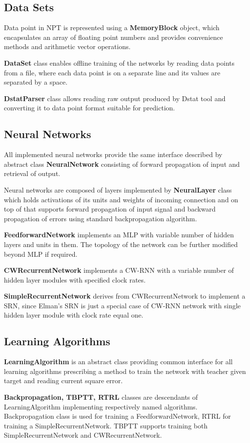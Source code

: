 \documentclass[12pt,oneside]{fithesis2}
\begin{document}
\subsection{Data Sets}
	Data point in NPT is represented using a \textbf{MemoryBlock} object, which encapsulates an array of floating point numbers and provides convenience methods and arithmetic vector operations.\par
	\textbf{DataSet} class enables offline training of the networks by reading data points from a file, where each data point is on a separate line and its values are separated by a space. \par
	\textbf{DstatParser} class allows reading raw output produced by Dstat tool and converting it to data point format suitable for prediction.
\subsection{Neural Networks}
All implemented neural networks provide the same interface described by abstract class \textbf{NeuralNetwork} consisting of forward propagation of input and retrieval of output. \par
Neural networks are composed of layers implemented by \textbf{NeuralLayer} class which holds activations of its units and weights of incoming connection and on top of that supports forward propagation of input signal and backward propagation of errors using standard backpropagation algorithm. \par
\textbf{FeedforwardNetwork} implements an MLP with variable number of hidden layers and units in them. The topology of the network can be further modified beyond MLP if required. \par
\textbf{CWRecurrentNetwork} implements a CW-RNN with a variable number of hidden layer modules with specified clock rates. \par
\textbf{SimpleRecurrentNetwork} derives from CWRecurrentNetwork to implement a SRN, since Elman's SRN is just a special case of CW-RNN network with single hidden layer module with clock rate equal one. \par

\subsection{Learning Algorithms}
\textbf{LearningAlgorithm} is an abstract class providing common interface for all learning algorithms prescribing a method to train the network with teacher given target and reading current square error. \par
\textbf{Backpropagation, TBPTT, RTRL} classes are descendants of LearningAlgorithm implementing respectively named algorithms. Backpropagation class is used for training a FeedforwardNetwork, RTRL for training a SimpleRecurrentNetwork. TBPTT supports training both SimpleRecurrentNetwork and CWRecurrentNetwork.
\end{document}
